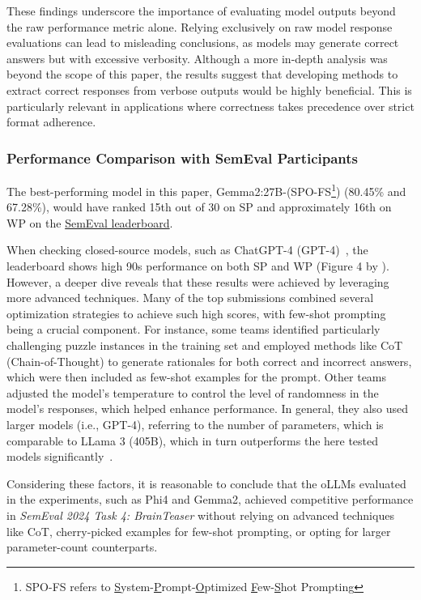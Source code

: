 These findings underscore the importance of evaluating model outputs beyond the raw performance metric alone. Relying exclusively on raw model response evaluations can lead to misleading conclusions, as models may generate correct answers but with excessive verbosity. Although a more in-depth analysis was beyond the scope of this paper, the results suggest that developing methods to extract correct responses from verbose outputs would be highly beneficial. This is particularly relevant in applications where correctness takes precedence over strict format adherence.

\subsubsection{Performance Comparison with SemEval Participants}

The best-performing model in this paper, Gemma2:27B-(SPO-FS\footnote{SPO-FS refers to \underline{S}ystem-\underline{P}rompt-\underline{O}ptimized \underline{F}ew-\underline{S}hot Prompting}) (80.45\% and 67.28\%), would have ranked 15th out of 30 on \ac{SP} and approximately 16th on \ac{WP} on the \href{https://brainteasersem.github.io/\#leaderboard}{SemEval leaderboard}.

When checking closed-source models, such as ChatGPT-4 (GPT-4)~\cite{openaiGPT4TechnicalReport2024}, the leaderboard shows high 90s performance on both \ac{SP} and \ac{WP} (Figure 4 by \textcite{jiangSemEval2024Task92024}). However, a deeper dive reveals that these results were achieved by leveraging more advanced techniques. Many of the top submissions combined several optimization strategies to achieve such high scores, with few-shot prompting being a crucial component. For instance, some teams identified particularly challenging puzzle instances in the training set and employed methods like \ac{CoT} (Chain-of-Thought) to generate rationales for both correct and incorrect answers, which were then included as few-shot examples for the prompt. Other teams adjusted the model's temperature to control the level of randomness in the model's responses, which helped enhance performance. In general, they also used larger models (i.e., GPT-4), referring to the number of parameters, which is comparable to LLama 3 (405B), which in turn outperforms the here tested models significantly~\cite{grattafioriLlama3Herd2024, openaiGPT4TechnicalReport2024}.

Considering these factors, it is reasonable to conclude that the \acp{oLLM} evaluated in the experiments, such as Phi4 and Gemma2, achieved competitive performance in \textit{SemEval 2024 Task 4: BrainTeaser} without relying on advanced techniques like \ac{CoT}, cherry-picked examples for few-shot prompting, or opting for larger parameter-count counterparts.

